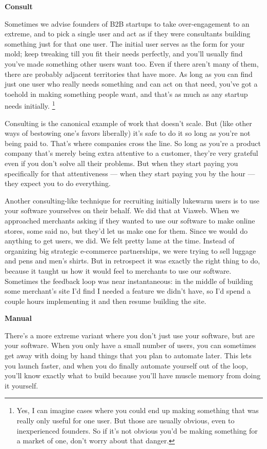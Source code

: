 \documentclass[12pt]{book}
\begin{document}
\textbf{Consult}

Sometimes we advise founders of B2B startups to take over-engagement to
an extreme, and to pick a single user and act as if they were
consultants building something just for that one user. The initial user
serves as the form for your mold; keep tweaking till you fit their needs
perfectly, and you'll usually find you've made something other users
want too. Even if there aren't many of them, there are probably adjacent
territories that have more. As long as you can find just one user who
really needs something and can act on that need, you've got a toehold in
making something people want, and that's as much as any startup needs
initially. \footnote{Yes, I can imagine cases where you could end up making something
that was really only useful for one user. But those are usually obvious,
even to inexperienced founders. So if it's not obvious you'd be making
something for a market of one, don't worry about that danger.}

Consulting is the canonical example of work that doesn't scale. But
(like other ways of bestowing one's favors liberally) it's safe to do it
so long as you're not being paid to. That's where companies cross the
line. So long as you're a product company that's merely being extra
attentive to a customer, they're very grateful even if you don't solve
all their problems. But when they start paying you specifically for that
attentiveness --- when they start paying you by the hour --- they expect
you to do everything.

Another consulting-like technique for recruiting initially lukewarm
users is to use your software yourselves on their behalf. We did that at
Viaweb. When we approached merchants asking if they wanted to use our
software to make online stores, some said no, but they'd let us make one
for them. Since we would do anything to get users, we did. We felt
pretty lame at the time. Instead of organizing big strategic e-commerce
partnerships, we were trying to sell luggage and pens and men's shirts.
But in retrospect it was exactly the right thing to do, because it
taught us how it would feel to merchants to use our software. Sometimes
the feedback loop was near instantaneous: in the middle of building some
merchant's site I'd find I needed a feature we didn't have, so I'd spend
a couple hours implementing it and then resume building the site.

\textbf{Manual}

There's a more extreme variant where you don't just use your software,
but are your software. When you only have a small number of users, you
can sometimes get away with doing by hand things that you plan to
automate later. This lets you launch faster, and when you do finally
automate yourself out of the loop, you'll know exactly what to build
because you'll have muscle memory from doing it yourself.
\end{document}
